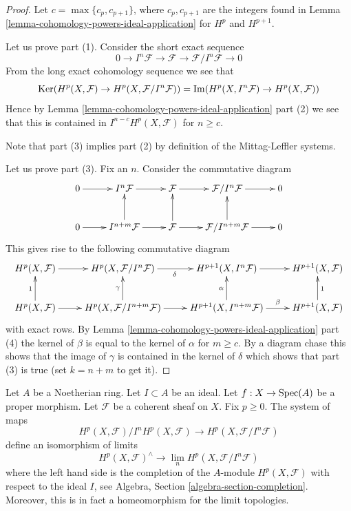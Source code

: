 \begin{proof}
Let $c = \max\{c_p, c_{p + 1}\}$, where $c_p, c_{p + 1}$ are the integers
found in Lemma \ref{lemma-cohomology-powers-ideal-application} for
$H^p$ and $H^{p + 1}$.

\medskip\noindent
Let us prove part (1). Consider the short exact sequence
$$
0 \to I^n\mathcal{F} \to \mathcal{F} \to \mathcal{F}/I^n\mathcal{F} \to 0
$$
From the long exact cohomology sequence we see that
$$
\mathop{\mathrm{Ker}}(
H^p(X, \mathcal{F}) \to H^p(X, \mathcal{F}/I^n\mathcal{F})
)
=
\mathop{\mathrm{Im}}(
H^p(X, I^n\mathcal{F}) \to H^p(X, \mathcal{F})
)
$$
Hence by Lemma \ref{lemma-cohomology-powers-ideal-application} part (2)
we see that this is contained in $I^{n - c}H^p(X, \mathcal{F})$ for $n \geq c$.

\medskip\noindent
Note that part (3) implies part (2) by definition of the Mittag-Leffler
systems.

\medskip\noindent
Let us prove part (3). Fix an $n$. Consider the commutative diagram
$$
\xymatrix{
0 \ar[r] &
I^n\mathcal{F} \ar[r] &
\mathcal{F} \ar[r] &
\mathcal{F}/I^n\mathcal{F} \ar[r] &
0 \\
0 \ar[r] &
I^{n + m}\mathcal{F} \ar[r] \ar[u] &
\mathcal{F} \ar[r] \ar[u] &
\mathcal{F}/I^{n + m}\mathcal{F} \ar[r] \ar[u] &
0
}
$$
This gives rise to the following commutative diagram
$$
\xymatrix{
H^p(X, \mathcal{F}) \ar[r] &
H^p(X, \mathcal{F}/I^n\mathcal{F}) \ar[r]_\delta &
H^{p + 1}(X, I^n\mathcal{F}) \ar[r] &
H^{p + 1}(X, \mathcal{F}) \\
H^p(X, \mathcal{F}) \ar[r] \ar[u]^1 &
H^p(X, \mathcal{F}/I^{n + m}\mathcal{F}) \ar[r] \ar[u]^\gamma &
H^{p + 1}(X, I^{n + m}\mathcal{F}) \ar[u]^\alpha \ar[r]^-\beta &
H^{p + 1}(X, \mathcal{F}) \ar[u]_1
}
$$
with exact rows. By
Lemma \ref{lemma-cohomology-powers-ideal-application} part (4) the kernel
of $\beta$ is equal to the kernel of $\alpha$ for $m \geq c$.
By a diagram chase this shows that the image of $\gamma$ is contained
in the kernel of $\delta$ which shows that part (3) is true
(set $k = n + m$ to get it).
\end{proof}

\begin{theorem}
\label{theorem-formal-functions}
Let $A$ be a Noetherian ring.
Let $I \subset A$ be an ideal.
Let $f : X \to \mathop{\mathrm{Spec}}(A)$ be a proper morphism.
Let $\mathcal{F}$ be a coherent sheaf on $X$.
Fix $p \geq 0$.
The system of maps
$$
H^p(X, \mathcal{F})/I^nH^p(X, \mathcal{F})
\longrightarrow
H^p(X, \mathcal{F}/I^n\mathcal{F})
$$
define an isomorphism of limits
$$
H^p(X, \mathcal{F})^\wedge
\longrightarrow
\lim_n H^p(X, \mathcal{F}/I^n\mathcal{F})
$$
where the left hand side is the completion of the $A$-module
$H^p(X, \mathcal{F})$ with respect to the ideal $I$, see
Algebra, Section \ref{algebra-section-completion}.
Moreover, this is in fact a homeomorphism for the limit topologies.
\end{theorem}

